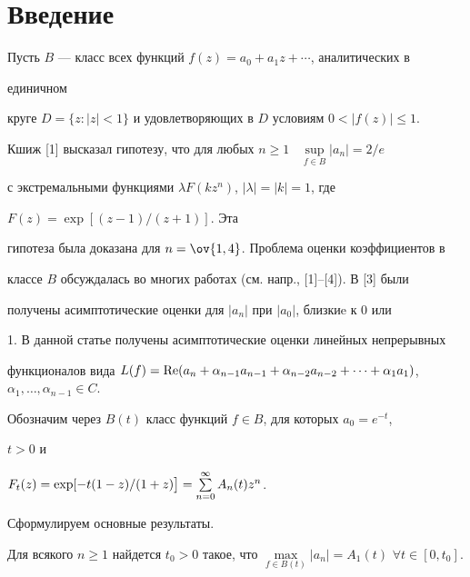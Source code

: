 \label{begin} 


 


 


\section*{Введение} 


 


Пусть $B$ --- класс всех функций $f(z)=a_0+a_1z+\dotsb$, аналитических в 


единичном 


круге $D=\{z:|z|<1\}$ и удовлетворяющих в $D$ условиям $0<|f(z)|\le1$. 


 


Кшиж [1] высказал гипотезу, что для любых $n\ge1$ \ $\sup\limits_{f\in 


B}|a_n|=2/e$ 


с экстремальными функциями $\lambda F(k z^n)$, $|\lambda|=|k|=1$, где 


$F(z)=\exp[(z-1)/(z+1)]$. Эта 


гипотеза была доказана для $n=\ov{1,4}$. Проблема оценки коэффициентов в 


классе $B$ обсуждалась во многих работах (см. напр., [1]--[4]). В [3] были 


получены асимптотические оценки для $|a_n|$ при $|a_0|$, близкиe к 0 или 


1. В данной статье получены асимптотические оценки линейных непрерывных 


функционалов вида $L(f)=\re(a_n+\alpha_{n-1} a_{n-1}+\alpha_{n-2} 


a_{n-2}+\dotsb+\alpha_1a_1)$, $\alpha_1,\dotsc,\alpha_{n-1}\in C$. 


 


Обозначим через $B(t)$ класс функций $f\in B$, для которых $a_0=e^{-t}$, 


$t>0$ и 


$F_t(z)=\linebreak\exp[-t(1-z)/(1+z)\big]=\sum\limits^\infty_{n=0}A_n(t)z^n$. 


 


Сформулируем основные результаты. 


 


\begin{thm} 


Для всякого $n\ge1$ найдется $t_0>0$ такое, что $\max\limits_{f\in 


B(t)}|a_n|=A_1(t)$\; $\forall t\in[0,t_0]$. 


\end{thm} 


